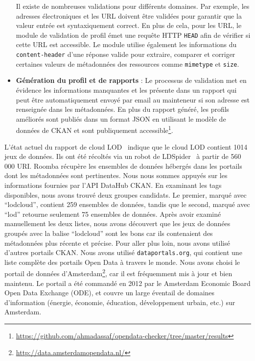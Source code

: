 \begin{itemize}
	Il existe de nombreuses validations pour diff\'{e}rents domaines. Par exemple, les adresses \'{e}lectroniques et les URL doivent être valid\'{e}es pour garantir que la valeur entr\'{e}e est syntaxiquement correct. En plus de cela, pour les URL, le module de validation de profil \'{e}met une requête HTTP \texttt{HEAD} afin de v\'{e}rifier si cette URL est accessible. Le module utilise \'{e}galement les informations du \texttt{content-header} d'une r\'{e}ponse valide pour extraire, comparer et corriger certaines valeurs de m\'{e}tadonn\'{e}es des ressources comme \texttt{mimetype} et \texttt{size}.
	\item \textbf{G\'{e}n\'{e}ration du profil et de rapports} : Le processus de validation met en \'{e}vidence les informations manquantes et les pr\'{e}sente dans un rapport qui peut être automatiquement envoy\'{e} par email au mainteneur si son adresse est renseign\'{e}e dans les m\'{e}tadonn\'{e}es. En plus du rapport g\'{e}n\'{e}r\'{e}, les profils am\'{e}lior\'{e}s sont publi\'{e}s dans un format JSON en utilisant le mod\`{e}le de donn\'{e}es de CKAN et sont publiquement accessible\footnote{\url{https://github.com/ahmadassaf/opendata-checker/tree/master/results}}.
\end{itemize}

L'\'{e}tat actuel du rapport de cloud LOD~\cite{Schmachtenberg:ISWC:14} indique que le cloud LOD contient 1014 jeux de donn\'{e}es. Ils ont \'{e}t\'{e} r\'{e}colt\'{e}s via un robot de LDSpider~\cite{Isele:ISWC:10} à partir de 560 000 URI. Roomba r\'{e}cup\`{e}re les ensembles de donn\'{e}es h\'{e}berg\'{e}s dans les portails dont les m\'{e}tadonn\'{e}es sont pertinentes. Nous nous sommes appuy\'{e}s sur les informations fournies par l'API DataHub CKAN. En examinant les tags disponibles, nous avons trouv\'{e} deux groupes candidats. Le premier, marqu\'{e} avec ``lodcloud'', contient 259 ensembles de donn\'{e}es, tandis que le second, marqu\'{e} avec ``lod'' retourne seulement 75 ensembles de donn\'{e}es. Apr\`{e}s avoir examin\'{e} manuellement les deux listes, nous avons d\'{e}couvert que les jeux de donn\'{e}es group\'{e}s avec la balise ``lodcloud'' sont les bons car ils contenaient des m\'{e}tadonn\'{e}es plus r\'{e}cente et pr\'{e}cise. Pour aller plus loin, nous avons utilis\'{e} d'autres portails CKAN. Nous avons utilis\'{e} \texttt{dataportals.org}, qui contient une liste compl\`{e}te des portails Open Data à travers le monde. Nous avons choisi le portail de donn\'{e}es d'Amsterdam\footnote{\url{http://data.amsterdamopendata.nl/}}, car il est fr\'{e}quemment mis à jour et bien maintenu. Le portail a \'{e}t\'{e} command\'{e} en 2012 par le Amsterdam Economic Board Open Data Exchange (ODE), et couvre un large \'{e}ventail de domaines d'information (\'{e}nergie, \'{e}conomie, \'{e}ducation, d\'{e}veloppement urbain, etc.) sur Amsterdam.

